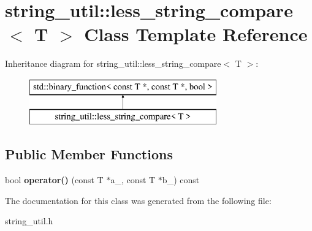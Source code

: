 \section{string\+\_\+util\+:\+:less\+\_\+string\+\_\+compare$<$ T $>$ Class Template Reference}
\label{classstring__util_1_1less__string__compare}
Inheritance diagram for string\+\_\+util\+:\+:less\+\_\+string\+\_\+compare$<$ T $>$\+:\begin{figure}[H]
\begin{center}
\leavevmode
\includegraphics[height=2.000000cm]{classstring__util_1_1less__string__compare}
\end{center}
\end{figure}
\subsection*{Public Member Functions}
\begin{DoxyCompactItemize}
\item 
bool {\bfseries operator()} (const T $\ast$a\+\_\+, const T $\ast$b\+\_\+) const \label{classstring__util_1_1less__string__compare_aa97df82edd8f7e33e5715acf71759337}

\end{DoxyCompactItemize}


The documentation for this class was generated from the following file\+:\begin{DoxyCompactItemize}
\item 
string\+\_\+util.\+h\end{DoxyCompactItemize}

